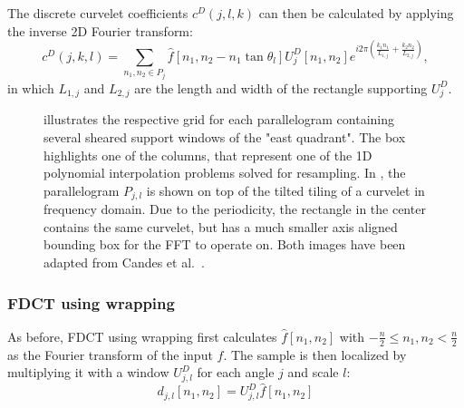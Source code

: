 The discrete curvelet coefficients $c^D(j, l, k)$ can then be calculated by
applying the inverse 2D Fourier transform:
\begin{equation*}
    c^D(j, k, l) = \sum_{n_1, n_2 \in P_j} \hat{f}[n_1, n_2 - n_1 \tan \theta_l] U_j^D[n_1, n_2] e^{i 2 \pi \left(\frac{k_1 n_1}{L_{1, j}} + \frac{k_2 n_2}{L_{2,j}}\right)},
\end{equation*}
in which $L_{1, j}$ and $L_{2, j}$ are the length and width of the rectangle supporting $U_j^D$.

\begin{figure}[h]
    \centering
    \quad
    \caption[Frequency tilings for USFFT and wrapping]{
         illustrates the respective grid for
        each parallelogram containing several sheared support windows of the
        "east quadrant". The box highlights one of the columns, that represent
        one of the 1D polynomial interpolation problems solved for resampling.
        In , the parallelogram $P_{j ,l}$
        is shown on top of the tilted tiling of a curvelet in frequency domain.
        Due to the periodicity, the rectangle in the center contains the same
        curvelet, but has a much smaller axis aligned bounding box for the FFT
        to operate on. Both images have been adapted from Candes et al.\ 
        \autocite{candes_fast_2006}.
    }
    \label{fig:curvelet_discrete_tilings}
\end{figure}

\subsubsection{FDCT using wrapping}

As before, FDCT using wrapping first calculates $\hat{f}[n_1, n_2]$ with
$-\frac{n}{2} \leq n_1, n_2 < \frac{n}{2}$ as the Fourier transform of the
input $f$. The sample is then localized by multiplying it with a window $U_{j,
l}^D$ for each angle $j$ and scale $l$:
\begin{equation*}
    d_{j, l}[n_1, n_2] = U_{j, l}^D \hat{f}[n_1, n_2]
\end{equation*}

